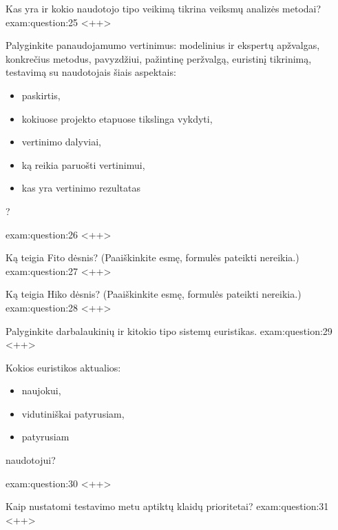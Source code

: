 \begin{question}{%
  Kas yra ir kokio naudotojo tipo veikimą tikrina veiksmų analizės metodai?
  }{exam:question:25}
  <++>
\end{question}

\begin{question}{%
  Palyginkite panaudojamumo vertinimus: modelinius ir ekspertų apžvalgas,
  konkrečius metodus, pavyzdžiui, pažintinę peržvalgą, euristinį
  tikrinimą, testavimą su naudotojais šiais aspektais:
  \begin{itemize}
    \item paskirtis,
    \item kokiuose projekto etapuose tikslinga vykdyti,
    \item vertinimo dalyviai,
    \item ką reikia paruošti vertinimui,
    \item kas yra vertinimo rezultatas
  \end{itemize}
  ?
  }{exam:question:26}
  <++>
\end{question}

\begin{question}{%
  Ką teigia Fito dėsnis? (Paaiškinkite esmę, formulės pateikti nereikia.)
  }{exam:question:27}
  <++>
\end{question}

\begin{question}{%
  Ką teigia Hiko dėsnis? (Paaiškinkite esmę, formulės pateikti nereikia.)
  }{exam:question:28}
  <++>
\end{question}

\begin{question}{%
  Palyginkite darbalaukinių ir kitokio tipo sistemų euristikas.
  }{exam:question:29}
  <++>
\end{question}

\begin{question}{%
  Kokios euristikos aktualios:
  \begin{itemize}
    \item naujokui,
    \item vidutiniškai patyrusiam,
    \item patyrusiam
  \end{itemize}
  naudotojui?
  }{exam:question:30}
  <++>
\end{question}

\begin{question}{%
  Kaip nustatomi testavimo metu aptiktų klaidų prioritetai?
  }{exam:question:31}
  <++>
\end{question}

